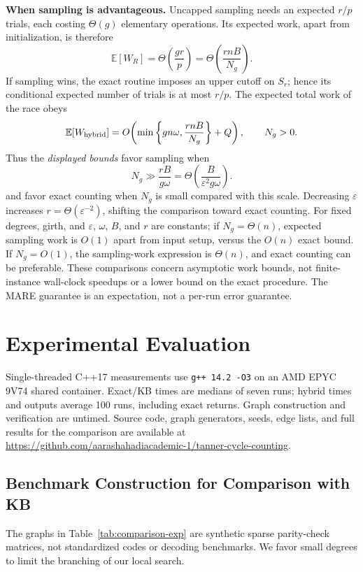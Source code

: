 \documentclass[conference]{IEEEtran}
\begin{document}
\noindent\textbf{When sampling is advantageous.}
Uncapped sampling needs an expected $r/p$ trials,
each costing $\Theta(g)$ elementary operations. Its expected
work, apart from initialization, is therefore
\begin{equation}\label{eq:random-work}
 \mathbb E[W_R]
 =\Theta\!\left(\frac{gr}{p}\right)
 =\Theta\!\left(\frac{rnB}{N_g}\right).
\end{equation}
If sampling wins, the exact routine imposes an upper cutoff
on $S_r$; hence its conditional expected number of trials
is at most $r/p$. The expected total work of the race obeys
\begin{equation}\label{eq:hybrid-expected-work}
 \mathbb E[W_{\rm hybrid}]
 =O\!\left(
 \min\left\{gn\omega,\frac{rnB}{N_g}\right\}+Q
 \right),\qquad N_g>0.
\end{equation}
Thus the \emph{displayed bounds} favor sampling when
\begin{equation}\label{eq:rich-regime}
 N_g\gg \frac{rB}{g\omega}
 =\Theta\!\left(\frac{B}{\varepsilon^2 g\omega}\right).
\end{equation}
and favor exact counting when $N_g$ is small compared with
this scale. Decreasing $\varepsilon$ increases
$r=\Theta(\varepsilon^{-2})$, shifting the comparison
toward exact counting. For fixed degrees, girth, and $\varepsilon$,
$\omega$, $B$, and $r$ are constants; if
$N_g=\Theta(n)$, expected sampling work is $O(1)$
apart from input setup, versus the $O(n)$ exact bound.
If $N_g=O(1)$, the sampling-work expression is
$\Theta(n)$, and exact counting can be preferable.
These comparisons concern asymptotic work bounds, not
finite-instance wall-clock speedups or a lower bound on
the exact procedure. The MARE guarantee is an expectation,
not a per-run error guarantee.

\section{Experimental Evaluation}\label{sec:experiments}
Single-threaded C++17 measurements use \texttt{g++ 14.2 -O3} on an
AMD EPYC 9V74 shared container. Exact/KB times are medians of seven runs;
hybrid times and outputs average 100 runs, including exact returns.
Graph construction and verification are untimed. Source code, graph generators, seeds, edge lists, and full results
for the comparison are available at
\url{https://github.com/aarashahadiacademic-1/tanner-cycle-counting}.

\subsection{Benchmark Construction for Comparison with KB
\cite{karimi2013}}
The graphs in Table~\ref{tab:comparison-exp} are synthetic sparse parity-check
matrices, not standardized codes or decoding benchmarks.
We favor small degrees to limit the branching of our local search.
\end{document}
